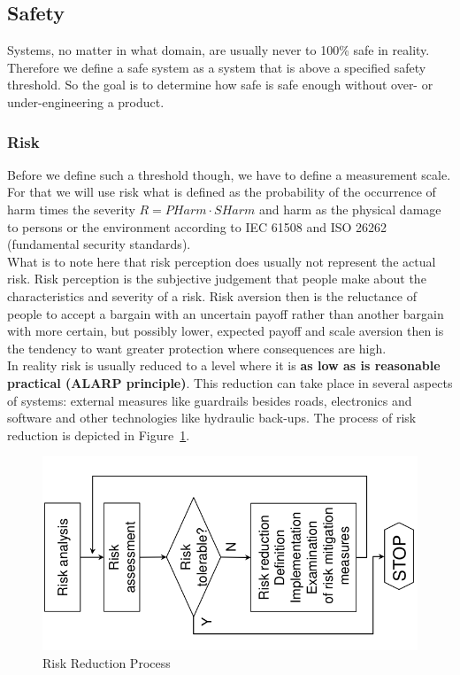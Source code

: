\subsection{Safety}
Systems, no matter in what domain, are usually never to 100\% safe in reality.
Therefore we define a safe system as a system that is above a specified safety threshold.
So the goal is to determine how safe is safe enough without over- or under-engineering a product.

\subsubsection*{Risk}
Before we define such a threshold though, we have to define a measurement scale.
For that we will use risk what is defined as the probability of the occurrence of harm times the severity $R = PHarm \cdot SHarm$ and harm as the physical damage to persons or the environment according to IEC 61508 and ISO 26262 (fundamental security standards).\\
What is to note here that risk perception does usually not represent the actual risk.
Risk perception is the subjective judgement that people make about the characteristics and severity of a risk.
Risk aversion then is the reluctance of people to accept a bargain with an uncertain payoff rather than another bargain with more certain, but possibly lower, expected payoff and scale aversion then is the tendency to want greater protection where consequences are high.\\

In reality risk is usually reduced to a level where it is \textbf{as low as is reasonable practical (ALARP principle)}.
This reduction can take place in several aspects of systems: external measures like guardrails besides roads, electronics and software and other technologies like hydraulic back-ups.
The process of risk reduction is depicted in Figure~\ref{fig:risk_reduction_process}.\\
\begin{figure}[h]
  \centering
  \includegraphics[width=.8\textwidth]{images/risk_reduction_process.png}
  \caption{Risk Reduction Process}\label{fig:risk_reduction_process}
\end{figure}

